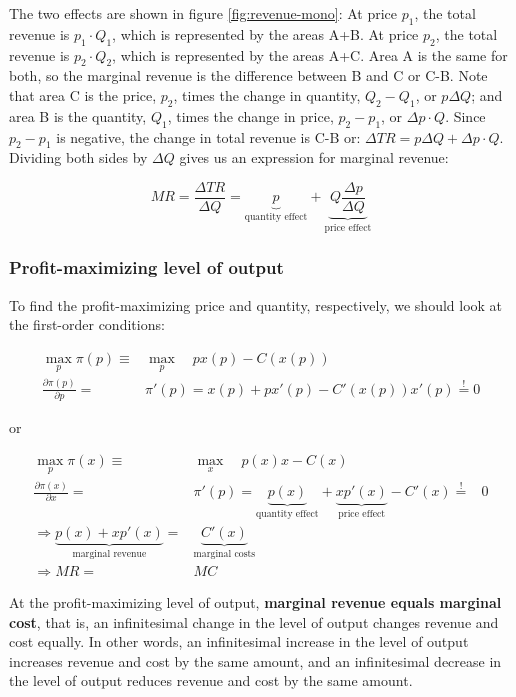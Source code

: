 \documentclass[
  12pt,
  oneside]{book}
\theoremstyle{definition}
\theoremstyle{definition}
\theoremstyle{definition}
\theoremstyle{definition}
\theoremstyle{remark}
\begin{document}
The two effects are shown in figure \ref{fig:revenue-mono}: At price \(p_1\), the total revenue is \(p_1 \cdot Q_1\), which is represented by the areas A+B. At price \(p_2\), the total revenue is \(p_2 \cdot Q_2\), which is represented by the areas A+C. Area A is the same for both, so the marginal revenue is the difference between B and C or C-B. Note that area C is the price, \(p_2\), times the change in quantity, \(Q_2 - Q_1\), or \(p \Delta Q\); and area B is the quantity, \(Q_1\), times the change in price, \(p_2 - p_1\), or \(\Delta p \cdot Q\). Since \(p_2 - p_1\) is negative, the change in total revenue is C-B or: \(\Delta TR = p \Delta Q + \Delta p \cdot Q\). Dividing both sides by \(\Delta Q\) gives us an expression for marginal revenue:

\[
MR = \frac{\Delta TR}{\Delta Q} = \underbrace{p}_{\text{quantity effect}} + \underbrace{Q \frac{\Delta p}{\Delta Q}}_{\text{price effect}}
\]

\subsubsection*{Profit-maximizing level of output}\label{profit-maximizing-level-of-output}

To find the profit-maximizing price and quantity, respectively, we should look at the first-order conditions:

\begin{align*}
\max_{p} \pi (p) \equiv& \max_{p} \quad px(p) - C(x(p))\\
\frac{\partial \pi (p)}{\partial p} =& \pi ' (p) = x(p) + px'(p) - C'(x(p))x'(p) \overset{!}{=} 0
\end{align*}

or

\begin{align*}
\max_{p} \pi (x) \equiv& \max_{x} \quad p(x)x - C(x)\\
\frac{\partial \pi (x)}{\partial x} =& \pi ' (p) = \underbrace{p(x)}_{\text{quantity effect}} + \underbrace{xp'(x)}_{\text{price effect}} - C'(x) \overset{!}{=}& 0\\
\Rightarrow \underbrace{p(x) + xp'(x)}_{\text{marginal revenue}} =& \underbrace{C'(x)}_{\text{marginal costs}}\\
\Rightarrow MR =& MC
\end{align*}

At the profit-maximizing level of output, \textbf{marginal revenue equals marginal cost}, that is, an infinitesimal change in the level of output changes revenue and cost equally. In other words, an infinitesimal increase in the level of output increases revenue and cost by the same amount, and an infinitesimal decrease in the level of output reduces revenue and cost by the same amount.
\end{document}
